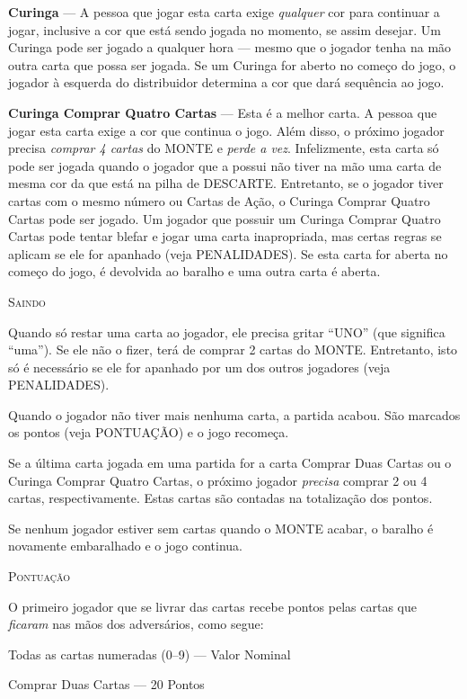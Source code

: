 \textbf{Curinga} --- A pessoa que jogar esta carta exige \textit{qualquer} cor para continuar a jogar, inclusive a cor que está sendo jogada no momento, se assim desejar. Um Curinga pode ser jogado a qualquer hora --- mesmo que o jogador tenha na mão outra carta que possa ser jogada. Se um Curinga for aberto no começo do jogo, o jogador à esquerda do distribuidor determina a cor que dará sequência ao jogo.

\textbf{Curinga Comprar Quatro Cartas} --- Esta é a melhor carta. A pessoa que jogar esta carta exige a cor que continua o jogo. Além disso, o próximo jogador precisa \textit{comprar 4 cartas} do MONTE e \textit{perde a vez}. Infelizmente, esta carta só pode ser jogada quando o jogador que a possui não tiver na mão uma carta de mesma cor da que está na pilha de DESCARTE. Entretanto, se o jogador tiver cartas com o mesmo número ou Cartas de Ação, o Curinga Comprar Quatro Cartas pode ser jogado. Um jogador que possuir um Curinga Comprar Quatro Cartas pode tentar blefar e jogar uma carta inapropriada, mas certas regras se aplicam se ele for apanhado (veja PENALIDADES). Se esta carta for aberta no começo do jogo, é devolvida ao baralho e uma outra carta é aberta.

\textsc{\large{Saindo}}

Quando só restar uma carta ao jogador, ele precisa gritar ``UNO'' (que significa ``uma''). Se ele não o fizer, terá de comprar 2 cartas do MONTE. Entretanto, isto só é necessário se ele for apanhado por um dos outros jogadores (veja PENALIDADES).

Quando o jogador não tiver mais nenhuma carta, a partida acabou. São marcados os pontos (veja PONTUAÇÃO) e o jogo recomeça.

Se a última carta jogada em uma partida for a carta Comprar Duas Cartas ou o Curinga Comprar Quatro Cartas, o próximo jogador \textit{precisa} comprar 2 ou 4 cartas, respectivamente. Estas cartas são contadas na totalização dos pontos.

Se nenhum jogador estiver sem cartas quando o MONTE acabar, o baralho é novamente embaralhado e o jogo continua.

\textsc{\large{Pontuação}}

O primeiro jogador que se livrar das cartas recebe pontos pelas cartas que \textit{ficaram} nas mãos dos adversários, como segue:

Todas as cartas numeradas (0--9) --- Valor Nominal

Comprar Duas Cartas --- 20 Pontos

